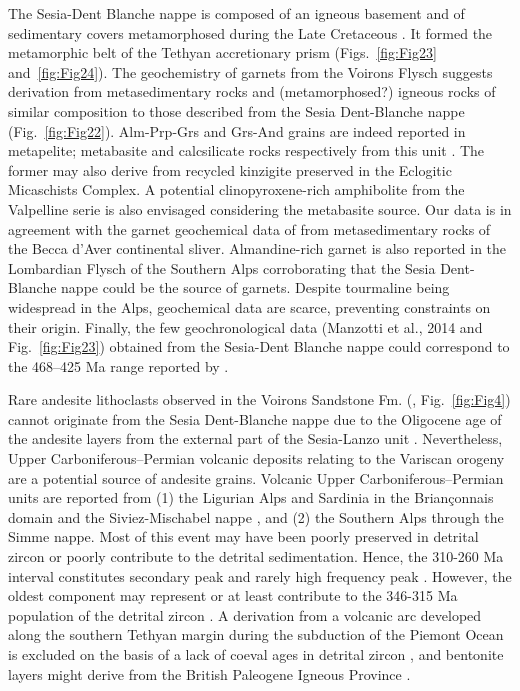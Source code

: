 \documentclass[twoside]{article}
\begin{document}
The Sesia-Dent Blanche nappe is composed of an igneous basement and of sedimentary covers metamorphosed during the Late Cretaceous \citep{Manzotti2014}. It formed the metamorphic belt of the Tethyan accretionary prism (Figs.~\ref{fig:Fig23} and~\ref{fig:Fig24}). The geochemistry of garnets from the Voirons Flysch suggests derivation from metasedimentary rocks and (metamorphosed?) igneous rocks of similar composition to those described from the Sesia Dent-Blanche nappe (Fig.~\ref{fig:Fig22}). Alm-Prp-Grs and Grs-And grains are indeed reported in metapelite; metabasite and calcsilicate rocks respectively from this unit \citep{DalPiaz1983}. The former may also derive from recycled kinzigite preserved in the Eclogitic Micaschists Complex. A potential clinopyroxene-rich amphibolite from the Valpelline serie is also envisaged considering the metabasite source. Our data is in agreement with the garnet geochemical data of \cite{Kirst2014} from metasedimentary rocks of the Becca d’Aver continental sliver. Almandine-rich garnet is also reported in the Lombardian Flysch of the Southern Alps \citep{Bernoulli1990} corroborating that the Sesia Dent-Blanche nappe could be the source of garnets. Despite tourmaline being widespread in the Alps, geochemical data are scarce, preventing constraints on their origin. Finally, the few geochronological data (Manzotti et al., 2014 and Fig.~\ref{fig:Fig23}) obtained from the Sesia-Dent Blanche nappe could correspond to the 468–425 Ma range reported by \cite{Butler2011}.\par
Rare andesite lithoclasts observed in the Voirons Sandstone Fm. (\citealp{Ospina-Ostios2013}, Fig.~\ref{fig:Fig4}) cannot originate from the Sesia Dent-Blanche nappe due to the Oligocene age of the andesite layers from the external part of the Sesia-Lanzo unit \citep[and references therein]{Venturelli1984}. Nevertheless, Upper Carboniferous–Permian volcanic deposits relating to the Variscan orogeny \citep{Cortesogno1998a} are a potential source of andesite grains. Volcanic Upper Carboniferous–Permian units are reported from (1) the Ligurian Alps and Sardinia in the Briançonnais domain \citep{Cortesogno1998a,Decarlis2013} and the Siviez-Mischabel nappe \citep{Sartori2006}, and (2) the Southern Alps \citep{Cortesogno1998a} through the Simme nappe. Most of this event may have been poorly preserved in detrital zircon or poorly contribute to the detrital sedimentation. Hence, the 310-260 Ma interval constitutes secondary peak and rarely high frequency peak \citep[see sample 11EB07 in 280-300 Ma range for the latter]{Butler2011}. However, the oldest component may represent or at least contribute to the 346-315 Ma population of the detrital zircon \citep[Fig.~\ref{fig:Fig23}]{Butler2011}. A derivation from a volcanic arc developed along the southern Tethyan margin during the subduction of the Piemont Ocean \citep{Gasinski1997} is excluded on the basis of a lack of coeval ages in detrital zircon \citep{Butler2011,Beltran-Trivino2013}, and bentonite layers \citep{Winkler1985a,Winkler1990} might derive from the British Paleogene Igneous Province \citep{Koch2015}.\par
\end{document}
